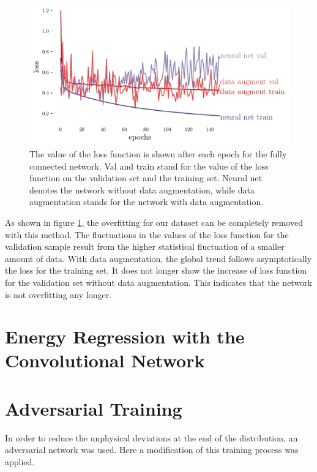 \documentclass[12pt, a4paper]{thesis}
\begin{document}
\begin{figure}[H]
  \centering
  \includegraphics[width=.9\linewidth]{../images/data_augment_loss.pdf}
  \caption{The value of the loss function is shown after each epoch
    for the fully connected network. Val and train stand for the value
    of the loss function on the validation set and the training
    set. Neural net denotes the network without data augmentation,
    while data augmentation stands for the network with data
    augmentation.}
  \label{da_loss}
\end{figure} 

As shown in figure \ref{da_loss}, the overfitting for our dataset can
be completely removed with this method.  The fluctuations in the
values of the loss function for the validation sample result from the
higher statistical fluctuation of a smaller amount of data. With data
augmentation, the global trend follows asymptotically the loss for the
training set. It does not longer show the increase of loss function
for the validation set without data augmentation. This indicates that
the network is not overfitting any longer.

\section{Energy Regression with the Convolutional Network}


\section{Adversarial Training}
\label{sec:org30a0273}


In order to reduce the unphysical deviations at the end of the
distribution, an adversarial network was used. Here a modification of
this training process was applied.
\end{document}

